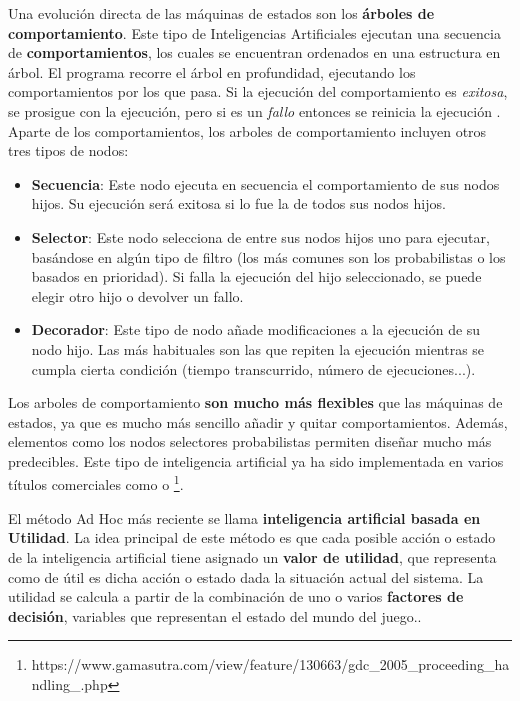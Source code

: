 Una evolución directa de las máquinas de estados son los \textbf{árboles de comportamiento}. Este tipo de Inteligencias Artificiales ejecutan una secuencia de \textbf{comportamientos}, los cuales se encuentran ordenados en una estructura en árbol. El programa recorre el árbol en profundidad, ejecutando los comportamientos por los que pasa. Si la ejecución del comportamiento es \textit{exitosa}, se prosigue con la ejecución, pero si es un \textit{fallo} entonces se reinicia la ejecución \cite{ai_and_games}. Aparte de los comportamientos, los arboles de comportamiento incluyen otros tres tipos de nodos:
\begin{itemize}
\item \textbf{Secuencia}: Este nodo ejecuta en secuencia el comportamiento de sus nodos hijos. Su ejecución será exitosa si lo fue la de todos sus nodos hijos.
\item \textbf{Selector}: Este nodo selecciona de entre sus nodos hijos uno para ejecutar, basándose en algún tipo de filtro (los más comunes son los probabilistas o los basados en prioridad). Si falla la ejecución del hijo seleccionado, se puede elegir otro hijo o devolver un fallo.
\item \textbf{Decorador}: Este tipo de nodo añade modificaciones a la ejecución de su nodo hijo. Las más habituales son las que repiten la ejecución mientras se cumpla cierta condición (tiempo transcurrido, número de ejecuciones...).
\end{itemize}

Los arboles de comportamiento \textbf{son mucho más flexibles} que las máquinas de estados, ya que es mucho más sencillo añadir y quitar comportamientos. Además, elementos como los nodos selectores probabilistas permiten diseñar mucho más predecibles. Este tipo de inteligencia artificial ya ha sido implementada en varios títulos comerciales como  o \footnote{https://www.gamasutra.com/view/feature/130663/gdc\_2005\_proceeding\_handling\_.php}.

El método Ad Hoc más reciente se llama \textbf{inteligencia artificial basada en Utilidad}. La idea principal de este método es que cada posible acción o estado de la inteligencia artificial tiene asignado un \textbf{valor de utilidad}, que representa como de útil es dicha acción o estado dada la situación actual del sistema. La utilidad se calcula a partir de la combinación de uno o varios \textbf{factores de decisión}, variables que representan el estado del mundo del juego.\cite{gameaipro}.

